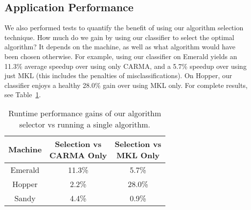 \subsection{Application Performance}
We also performed tests to quantify the benefit of using our algorithm selection technique.
How much do we gain by using our classifier to select the optimal algorithm?
It depends on the machine, as well as what algorithm would have been chosen otherwise.
For example, using our classifier on Emerald yields an 11.3\% average speedup over using only CARMA, and a 5.7\% speedup over using just MKL (this includes the penalties of misclassifications).
On Hopper, our classifier enjoys a healthy 28.0\% gain over using MKL only.
For complete results, see Table~\ref{t:improvements}.

\begin{table}[t]
    \begin{center}
        \begin{tabular}{c|c|c}
            Machine & \pbox{20cm}{Selection vs\\CARMA Only} & \pbox{20cm}{Selection vs\\MKL Only} \\ \hline
            Emerald & 11.3\% & 5.7\% \\
            Hopper & 2.2\% & 28.0\% \\
            Sandy & 4.4\% & 0.9\% \\
        \end{tabular}
    \end{center}
    \caption{Runtime performance gains of our algorithm selector vs running a single algorithm.}
    \label{t:improvements}
\end{table}
